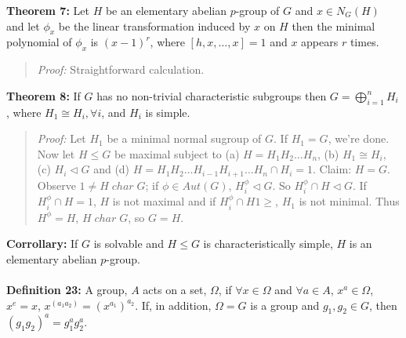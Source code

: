 {\bf Theorem 7:}
Let $H$ be an elementary abelian $p$-group of $G$ and $x \in N_G(H)$ and let $\phi_x$
be the linear transformation induced by $x$ on $H$ then the minimal polynomial of
$\phi_x$ is $(x-1)^r$, where $[h,x, \ldots, x]= 1$ and $x$ appears $r$ times.
\begin{quote}
\emph{Proof:}  Straightforward calculation.
\end{quote}
{\bf Theorem 8:}  If $G$ has no non-trivial characteristic subgroups then
$G= \bigoplus_{i=1}^n H_i$, where $H_1 \cong H_i, \forall i$, and $H_i$ is
simple.
\begin{quote}
\emph{Proof:} Let $H_1$ be a minimal normal sugroup of $G$.  If $H_1 = G$, we're done.
Now let $H \le G$ be maximal subject to (a) $H=H_1 H_2 \ldots H_n$, (b) $H_1 \cong H_i$,
(c) $H_i \lhd G$ and (d)
$H=H_1 H_2 \ldots H_{i-1} H_{i+1} \ldots H_n \cap H_i = 1$.  Claim:  $H=G$.  Observe
$1 \ne H \; char \; G$; if $\phi \in Aut(G)$, $H_i^{\phi} \lhd G$.
So $H_i^{\phi} \cap H \lhd G$.
If $H_i^{\phi} \cap H =1$, $H$ is not maximal and if
$H_i^{\phi} \cap H 1\ge $, $H_1$ is not minimal.
Thus $H^{\phi} = H$, $H \; char \; G$, so $G=H$.
\end{quote}
{\bf Corrollary:} If $G$ is solvable and $H \le G$ is characteristically simple, $H$
is an elementary abelian $p$-group.
\\
\\
{\bf Definition 23:} A group, $A$ acts on a set, $\Omega$, if $\forall x \in \Omega$ and $\forall a \in A$,
$x^a \in \Omega$, $x^e = x$, $x^{(a_1 a_2)} = (x^{a_1})^{a_2}$. If, in addition, $\Omega = G$ is a group and
$g_1 , g_2 \in G$, then $(g_1 g_2)^a = g_1^a g_2^a$.

